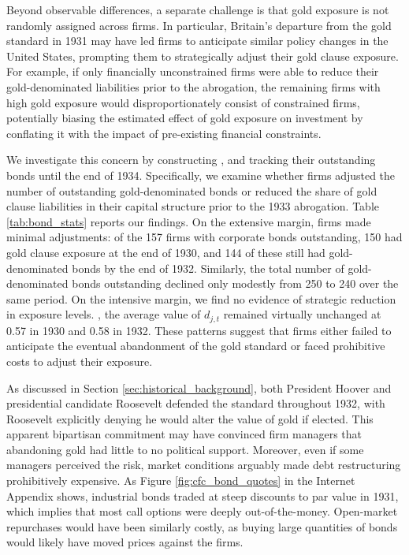 Beyond observable differences, a separate challenge is that gold exposure is not randomly assigned across firms. In particular, Britain's departure from the gold standard in 1931 may have led firms to anticipate similar policy changes in the United States, prompting them to strategically adjust their gold clause exposure. For example, if only financially unconstrained firms were able to reduce their gold-denominated liabilities prior to the abrogation, the remaining firms with high gold exposure would disproportionately consist of constrained firms, potentially biasing the estimated effect of gold exposure on investment by conflating it with the impact of pre-existing financial constraints.

We investigate this concern by constructing , and tracking their outstanding bonds until the end of 1934. Specifically, we examine whether firms adjusted the number of outstanding gold-denominated bonds or reduced the share of gold clause liabilities in their capital structure prior to the 1933 abrogation. Table \ref{tab:bond_stats} reports our findings. On the extensive margin, firms made minimal adjustments: of the 157 firms with corporate bonds outstanding, 150 had gold clause exposure at the end of 1930, and 144 of these still had gold-denominated bonds by the end of 1932. Similarly, the total number of gold-denominated bonds outstanding declined only modestly from 250 to 240 over the same period. On the intensive margin, we find no evidence of strategic reduction in exposure levels. , the average value of $d_{j,t}$ remained virtually unchanged at 0.57 in 1930 and 0.58 in 1932. These patterns suggest that firms either failed to anticipate the eventual abandonment of the gold standard or faced prohibitive costs to adjust their exposure.

As discussed in Section \ref{sec:historical_background}, both President Hoover and presidential candidate Roosevelt defended the standard throughout 1932, with Roosevelt explicitly denying he would alter the value of gold if elected. This apparent bipartisan commitment may have convinced firm managers that abandoning gold had little to no political support. Moreover, even if some managers perceived the risk, market conditions arguably made debt restructuring prohibitively expensive. As Figure \ref{fig:cfc_bond_quotes} in the Internet Appendix shows, industrial bonds traded at steep discounts to par value in 1931, which implies that most call options were deeply out-of-the-money. Open-market repurchases would have been similarly costly, as buying large quantities of bonds would likely have moved prices against the firms.

